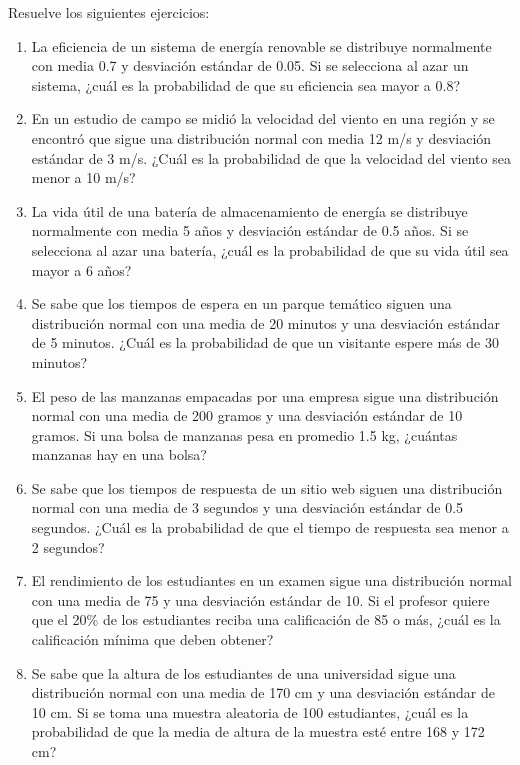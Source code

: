 \begin{Ejer}
Resuelve los siguientes ejercicios:
\begin{enumerate}


    \item La eficiencia de un sistema de energía renovable se distribuye normalmente con media 0.7 y desviación estándar de 0.05. Si se selecciona al azar un sistema, ¿cuál es la probabilidad de que su eficiencia sea mayor a 0.8?

    \item En un estudio de campo se midió la velocidad del viento en una región y se encontró que sigue una distribución normal con media 12 m/s y desviación estándar de 3 m/s. ¿Cuál es la probabilidad de que la velocidad del viento sea menor a 10 m/s?

    \item La vida útil de una batería de almacenamiento de energía se distribuye normalmente con media 5 años y desviación estándar de 0.5 años. Si se selecciona al azar una batería, ¿cuál es la probabilidad de que su vida útil sea mayor a 6 años?

    \item Se sabe que los tiempos de espera en un parque temático siguen una distribución normal con una media de 20 minutos y una desviación estándar de 5 minutos. ¿Cuál es la probabilidad de que un visitante espere más de 30 minutos?

    \item El peso de las manzanas empacadas por una empresa sigue una distribución normal con una media de 200 gramos y una desviación estándar de 10 gramos. Si una bolsa de manzanas pesa en promedio 1.5 kg, ¿cuántas manzanas hay en una bolsa?

    \item Se sabe que los tiempos de respuesta de un sitio web siguen una distribución normal con una media de 3 segundos y una desviación estándar de 0.5 segundos. ¿Cuál es la probabilidad de que el tiempo de respuesta sea menor a 2 segundos?

    \item El rendimiento de los estudiantes en un examen sigue una distribución normal con una media de 75 y una desviación estándar de 10. Si el profesor quiere que el 20\% de los estudiantes reciba una calificación de 85 o más, ¿cuál es la calificación mínima que deben obtener?

    \item Se sabe que la altura de los estudiantes de una universidad sigue una distribución normal con una media de 170 cm y una desviación estándar de 10 cm. Si se toma una muestra aleatoria de 100 estudiantes, ¿cuál es la probabilidad de que la media de altura de la muestra esté entre 168 y 172 cm?


\end{enumerate}
\end{Ejer}
